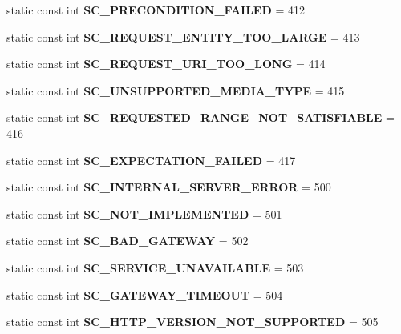 \begin{DoxyCompactItemize}
static const int {\bfseries S\+C\+\_\+\+P\+R\+E\+C\+O\+N\+D\+I\+T\+I\+O\+N\+\_\+\+F\+A\+I\+L\+ED} = 412
\item 
\mbox{\label{class_response_a26527de203425bb50b47a0b2ee3eb091}} 
static const int {\bfseries S\+C\+\_\+\+R\+E\+Q\+U\+E\+S\+T\+\_\+\+E\+N\+T\+I\+T\+Y\+\_\+\+T\+O\+O\+\_\+\+L\+A\+R\+GE} = 413
\item 
\mbox{\label{class_response_a58b3e815e3e557316664210734400844}} 
static const int {\bfseries S\+C\+\_\+\+R\+E\+Q\+U\+E\+S\+T\+\_\+\+U\+R\+I\+\_\+\+T\+O\+O\+\_\+\+L\+O\+NG} = 414
\item 
\mbox{\label{class_response_a1050724bb2aeec0d6a7cd80990eee3ca}} 
static const int {\bfseries S\+C\+\_\+\+U\+N\+S\+U\+P\+P\+O\+R\+T\+E\+D\+\_\+\+M\+E\+D\+I\+A\+\_\+\+T\+Y\+PE} = 415
\item 
\mbox{\label{class_response_a8d74e0df640fbb20e67cfe385f29e0ba}} 
static const int {\bfseries S\+C\+\_\+\+R\+E\+Q\+U\+E\+S\+T\+E\+D\+\_\+\+R\+A\+N\+G\+E\+\_\+\+N\+O\+T\+\_\+\+S\+A\+T\+I\+S\+F\+I\+A\+B\+LE} = 416
\item 
\mbox{\label{class_response_a6a08d4a1bd1a6f8be5bea947dcf26757}} 
static const int {\bfseries S\+C\+\_\+\+E\+X\+P\+E\+C\+T\+A\+T\+I\+O\+N\+\_\+\+F\+A\+I\+L\+ED} = 417
\item 
\mbox{\label{class_response_a3df3a79d926428927811db87c6ca4bf5}} 
static const int {\bfseries S\+C\+\_\+\+I\+N\+T\+E\+R\+N\+A\+L\+\_\+\+S\+E\+R\+V\+E\+R\+\_\+\+E\+R\+R\+OR} = 500
\item 
\mbox{\label{class_response_a184bac473b5b16a6974f261e087fb727}} 
static const int {\bfseries S\+C\+\_\+\+N\+O\+T\+\_\+\+I\+M\+P\+L\+E\+M\+E\+N\+T\+ED} = 501
\item 
\mbox{\label{class_response_af3baaf5bb2f84fc3c7a8d0647635a8e4}} 
static const int {\bfseries S\+C\+\_\+\+B\+A\+D\+\_\+\+G\+A\+T\+E\+W\+AY} = 502
\item 
\mbox{\label{class_response_a84d8b235b7205f3d5151bcc4c48251b1}} 
static const int {\bfseries S\+C\+\_\+\+S\+E\+R\+V\+I\+C\+E\+\_\+\+U\+N\+A\+V\+A\+I\+L\+A\+B\+LE} = 503
\item 
\mbox{\label{class_response_a809efeaf200932b0c809a534d96eab2b}} 
static const int {\bfseries S\+C\+\_\+\+G\+A\+T\+E\+W\+A\+Y\+\_\+\+T\+I\+M\+E\+O\+UT} = 504
\item 
\mbox{\label{class_response_a7eb76b1581392c331dccb71c87549b36}} 
static const int {\bfseries S\+C\+\_\+\+H\+T\+T\+P\+\_\+\+V\+E\+R\+S\+I\+O\+N\+\_\+\+N\+O\+T\+\_\+\+S\+U\+P\+P\+O\+R\+T\+ED} = 505
\end{DoxyCompactItemize}


